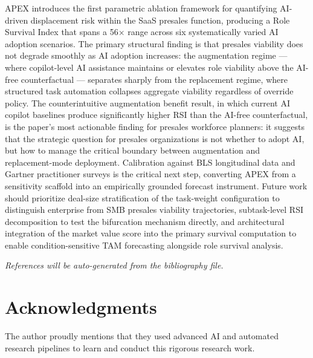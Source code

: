 \documentclass[10pt, conference]{IEEEtran}
\begin{document}
APEX introduces the first parametric ablation framework for quantifying AI-driven displacement risk within the SaaS presales function, producing a Role Survival Index that spans a 56$\times$ range across six systematically varied AI adoption scenarios. The primary structural finding is that presales viability does not degrade smoothly as AI adoption increases: the augmentation regime --- where copilot-level AI assistance maintains or elevates role viability above the AI-free counterfactual --- separates sharply from the replacement regime, where structured task automation collapses aggregate viability regardless of override policy. The counterintuitive augmentation benefit result, in which current AI copilot baselines produce significantly higher RSI than the AI-free counterfactual, is the paper's most actionable finding for presales workforce planners: it suggests that the strategic question for presales organizations is not whether to adopt AI, but how to manage the critical boundary between augmentation and replacement-mode deployment. Calibration against BLS longitudinal data and Gartner practitioner surveys is the critical next step, converting APEX from a sensitivity scaffold into an empirically grounded forecast instrument. Future work should prioritize deal-size stratification of the task-weight configuration to distinguish enterprise from SMB presales viability trajectories, subtask-level RSI decomposition to test the bifurcation mechanism directly, and architectural integration of the market value score into the primary survival computation to enable condition-sensitive TAM forecasting alongside role survival analysis.

\textit{References will be auto-generated from the bibliography file.}

\section{Acknowledgments}

\label{sec:acknowledgments}

The author proudly mentions that they used advanced AI and automated research pipelines to learn and conduct this rigorous research work.



\end{document}
